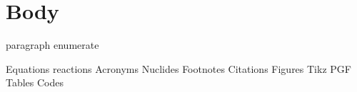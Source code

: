\chapter{Body}
\label{Chapter:Body}

paragraph enumerate

Equations
reactions
Acronyms
Nuclides
Footnotes
Citations
Figures
Tikz
PGF
Tables
Codes